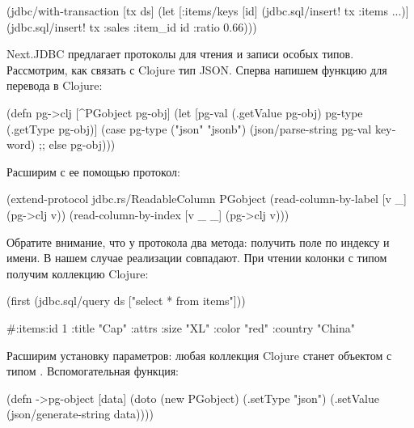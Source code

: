 \begin{english}
  \begin{clojure}
(jdbc/with-transaction [tx ds]
  (let [{:items/keys [id]}
        (jdbc.sql/insert! tx :items {...})]
    (jdbc.sql/insert!
       tx
       :sales
       {:item_id id :ratio 0.66})))
  \end{clojure}
\end{english}

Next.JDBC предлагает протоколы для чтения и записи особых типов. Рассмотрим, как связать с Clojure тип JSON. Сперва напишем функцию для перевода  в Clojure:

\begin{english}
  \begin{clojure}
(defn pg->clj [^PGobject pg-obj]
  (let [pg-val (.getValue pg-obj)
        pg-type (.getType pg-obj)]
    (case pg-type
      ("json" "jsonb")
      (json/parse-string pg-val keyword)
      ;; else
      pg-obj)))
  \end{clojure}
\end{english}

Расширим с ее помощью протокол:

\begin{english}
  \begin{clojure}
(extend-protocol jdbc.rs/ReadableColumn
  PGobject
  (read-column-by-label [v _]
    (pg->clj v))
  (read-column-by-index [v _ _]
    (pg->clj v)))
  \end{clojure}
\end{english}

Обратите внимание, что у протокола два метода: получить поле по индексу и имени. В нашем случае реализации совпадают. При чтении колонки с типом  получим коллекцию Clojure:

\begin{english}
  \begin{clojure}
(first (jdbc.sql/query ds ["select * from items"]))

#:items{:id 1
        :title "Cap"
        :attrs {:size "XL"
                :color "red"
                :country "China"}}
  \end{clojure}
\end{english}

Расширим установку параметров: любая коллекция Clojure станет объектом  с типом . Вспомогательная функция:

\begin{english}
  \begin{clojure}
(defn ->pg-object [data]
  (doto (new PGobject)
    (.setType "json")
    (.setValue (json/generate-string data))))
  \end{clojure}
\end{english}

